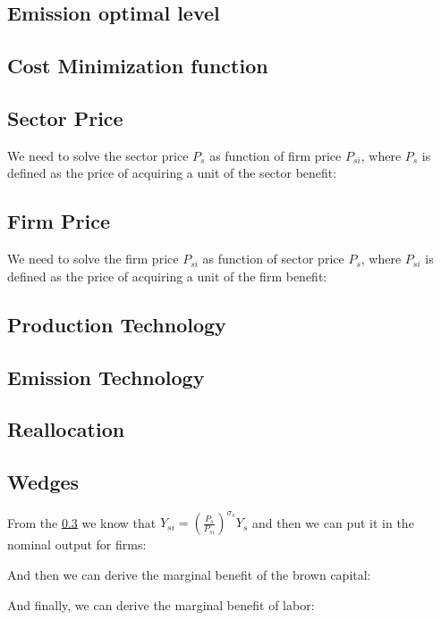 \documentclass[12pt]{article} %
\begin{document}
\subsection{Emission optimal level} \label{Ap:emission optimal level}


\subsection{Cost Minimization function} \label{Ap:cost minimization function}


\subsection{Sector Price} \label{Ap:sector price}
 We need to solve the sector price $P_s$ as function of firm price $P_{si}$, where $P_s$ is defined as the price of acquiring a unit of the sector benefit:
    

\subsection{Firm Price} \label{Ap:firm_price}
We need to solve the firm price $P_{si}$ as function of sector price $P_s$, where $P_{si}$ is defined as the price of acquiring a unit of the firm benefit:
    

\subsection{Production Technology}
\label{Ap:Productiontechnology}

\subsection{Emission Technology}
\label{Ap:Emissiontechnology}



\subsection{Reallocation} \label{Ap:reallocation}




\subsection{Wedges} \label{Ap:wedges}
From the \ref{Ap:sector price} we know that $Y_{si} = (\frac{P_s}{ P_{si}})^{\sigma_s}{Y}_s $ and then we can put it in the nominal output for firms:

And then we can derive the marginal benefit of the brown capital:

And finally, we can derive the marginal benefit of labor:


\subsection*{}


\end{document}
